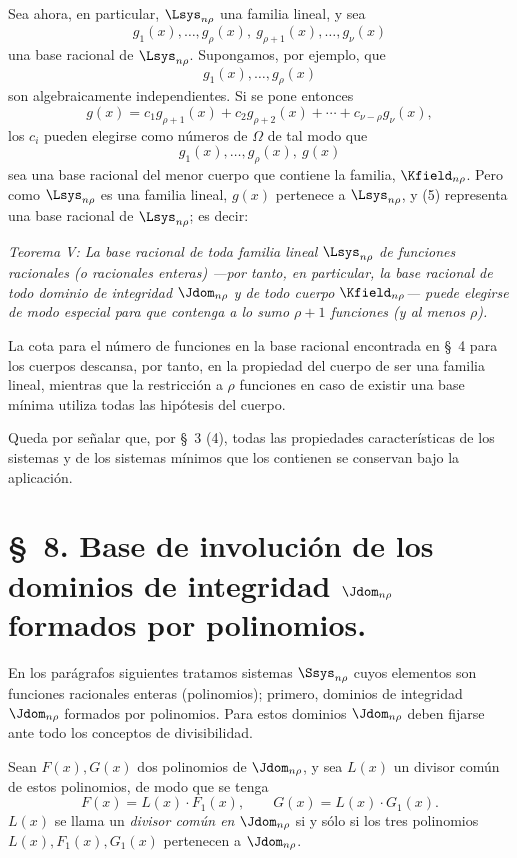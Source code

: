 \documentclass[11pt]{article}
\begin{document}
Sea ahora, en particular, $\Lsys_{n\rho}$ una familia lineal, y sea
\begin{equation}
  g_1(x),\ldots,g_\rho(x),\ g_{\rho+1}(x),\ldots,g_\nu(x)
\tag{4}
\end{equation}
una base racional de $\Lsys_{n\rho}$. Supongamos, por ejemplo, que
\[
  g_1(x),\ldots,g_\rho(x)
\]
son algebraicamente independientes. Si se pone entonces
\[
  g(x)=c_1g_{\rho+1}(x)+c_2g_{\rho+2}(x)+\cdots+c_{\nu-\rho}g_\nu(x),
\]
los $c_i$ pueden elegirse como números de $\Omega$ de tal modo que
\begin{equation}
  g_1(x),\ldots,g_\rho(x),\ g(x)
\tag{5}
\end{equation}
sea una base racional del menor cuerpo que contiene la familia, $\Kfield_{n\rho}$. Pero como $\Lsys_{n\rho}$ es una familia lineal, $g(x)$ pertenece a $\Lsys_{n\rho}$, y (5) representa una base racional de $\Lsys_{n\rho}$; es decir:

\emph{Teorema V: La base racional de toda familia lineal $\Lsys_{n\rho}$ de funciones racionales (o racionales enteras) ---por tanto, en particular, la base racional de todo dominio de integridad $\Jdom_{n\rho}$ y de todo cuerpo $\Kfield_{n\rho}$--- puede elegirse de modo especial para que contenga a lo sumo $\rho+1$ funciones (y al menos $\rho$).}

La cota para el número de funciones en la base racional encontrada en \S\ 4 para los cuerpos descansa, por tanto, en la propiedad del cuerpo de ser una familia lineal, mientras que la restricción a $\rho$ funciones en caso de existir una base mínima utiliza todas las hipótesis del cuerpo.

Queda por señalar que, por \S\ 3 (4), todas las propiedades características de los sistemas y de los sistemas mínimos que los contienen se conservan bajo la aplicación.

\section*{\S\ 8. Base de involución de los dominios de integridad $\Jdom_{n\rho}$ formados por polinomios.}

En los parágrafos siguientes tratamos sistemas $\Ssys_{n\rho}$ cuyos elementos son funciones racionales enteras (polinomios); primero, dominios de integridad $\Jdom_{n\rho}$ formados por polinomios. Para estos dominios $\Jdom_{n\rho}$ deben fijarse ante todo los conceptos de divisibilidad.

Sean $F(x),G(x)$ dos polinomios de $\Jdom_{n\rho}$, y sea $L(x)$ un divisor común de estos polinomios, de modo que se tenga
\[
  F(x)=L(x)\cdot F_1(x),\qquad G(x)=L(x)\cdot G_1(x).
\]
$L(x)$ se llama un \emph{divisor común en $\Jdom_{n\rho}$} si y sólo si los tres polinomios $L(x),F_1(x),G_1(x)$ pertenecen a $\Jdom_{n\rho}$.
\end{document}
